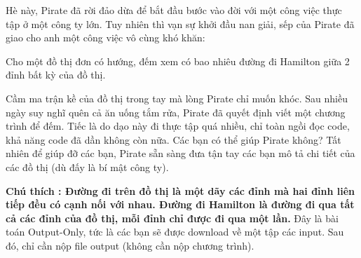 Hè này, Pirate đã rời đảo dừa để bắt đầu bước vào đời với một công việc thực tập ở một công ty lớn. Tuy nhiên thì vạn sự khởi đầu nan giải, sếp của Pirate đã giao cho anh một công việc vô cùng khó khăn:

Cho một đồ thị đơn có hướng, đếm xem có bao nhiêu đường đi Hamilton giữa 2 đỉnh bất kỳ của đồ thị.

Cầm ma trận kề của đồ thị trong tay mà lòng Pirate chỉ muốn khóc. Sau nhiều ngày suy nghĩ quên cả ăn uống tắm rửa, Pirate đã quyết định viết một chương trình để đếm. Tiếc là do dạo này đi thực tập quá nhiều, chỉ toàn ngồi đọc code, khả năng code đã dần không còn nữa. Các bạn có thể giúp Pirate không? Tất nhiên để giúp đỡ các bạn, Pirate sẵn sàng đưa tận tay các bạn mô tả chi tiết của các đồ thị (dù đấy là bí mật công ty).

\textbf{Chú thích : Đường đi trên đồ thị là một dãy các đỉnh mà hai đỉnh liên tiếp đều có cạnh nối với nhau. Đường đi Hamilton là đường đi qua tất cả các đỉnh của đồ thị, mỗi đỉnh chỉ được đi qua một lần. }
Đây là bài toán Output-Only, tức là các bạn sẽ được download về một tập các input. Sau đó, chỉ cần nộp file output (không cần nộp chương trình).